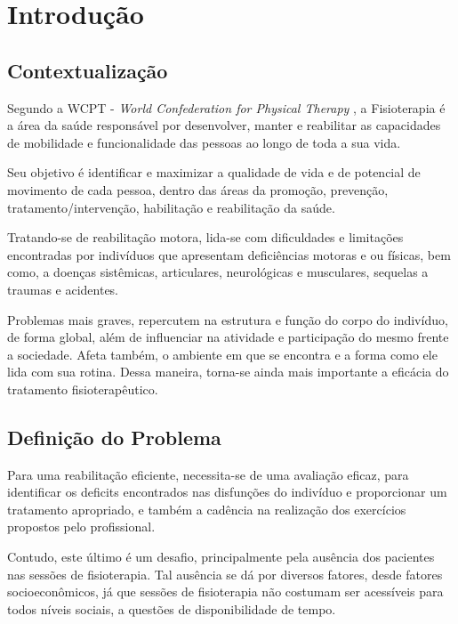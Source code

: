 \chapter[Introdução]{Introdução}
\section{Contextualização}
\label{Sec:contextualizacao}
  Segundo a WCPT - \textit{World Confederation for Physical Therapy }  \cite{wcpt}, a Fisioterapia é
 a área da saúde responsável por desenvolver, manter e reabilitar as
  capacidades de mobilidade e funcionalidade das pessoas ao longo de toda a sua vida.

  Seu objetivo é identificar e maximizar a qualidade de vida
 e de potencial de movimento de cada pessoa, dentro das áreas da promoção, prevenção,
  tratamento/intervenção, habilitação e reabilitação da saúde.

  Tratando-se de reabilitação motora, lida-se com dificuldades e limitações encontradas por
  indivíduos que apresentam deficiências motoras e ou físicas, bem como,
  a doenças sistêmicas, articulares, neurológicas e musculares, sequelas a
  traumas e acidentes.

  Problemas mais graves, repercutem
  na estrutura e função do corpo do indivíduo, de forma global, além de
  influenciar na atividade e participação do mesmo frente a sociedade. Afeta
  também, o ambiente em que se encontra e a forma como ele lida com sua rotina.
  Dessa maneira, torna-se ainda mais importante a eficácia do tratamento
  fisioterapêutico.



\section{Definição do Problema}
\label{Sec:DefinicaoProblema}

  Para uma reabilitação eficiente, necessita-se de uma avaliação eficaz,
 para identificar os deficits encontrados nas disfunções do indivíduo e proporcionar
  um tratamento apropriado, e também a cadência na realização dos exercícios propostos pelo
  profissional.

  Contudo, este último é um desafio, principalmente
  pela ausência dos pacientes nas sessões de fisioterapia. Tal ausência se dá por
  diversos fatores, desde fatores socioeconômicos, já que sessões de fisioterapia
  não costumam ser acessíveis para todos níveis sociais, a questões de disponibilidade de tempo.

